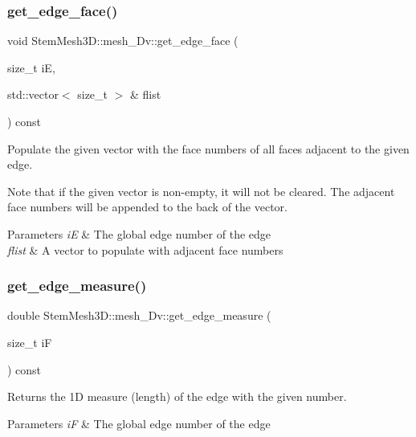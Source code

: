 \subsubsection{\texorpdfstring{get\+\_\+edge\+\_\+face()}{get\_edge\_face()}}
{\footnotesize\ttfamily void Stem\+Mesh3\+D\+::mesh\+\_\+Dv\+::get\+\_\+edge\+\_\+face (\begin{DoxyParamCaption}\item[{size\+\_\+t}]{iE,  }\item[{std\+::vector$<$ size\+\_\+t $>$ \&}]{flist }\end{DoxyParamCaption}) const}



Populate the given vector with the face numbers of all faces adjacent to the given edge. 

Note that if the given vector is non-\/empty, it will not be cleared. The adjacent face numbers will be appended to the back of the vector. 
\begin{DoxyParams}{Parameters}
{\em iE} & The global edge number of the edge \\
\hline
{\em flist} & A vector to populate with adjacent face numbers \\
\hline
\end{DoxyParams}
\mbox{\label{classStemMesh3D_1_1mesh__3Dv_a003b3bf1a525c821bfb5bb5cf666d3fe}} 
\subsubsection{\texorpdfstring{get\+\_\+edge\+\_\+measure()}{get\_edge\_measure()}}
{\footnotesize\ttfamily double Stem\+Mesh3\+D\+::mesh\+\_\+Dv\+::get\+\_\+edge\+\_\+measure (\begin{DoxyParamCaption}\item[{size\+\_\+t}]{iF }\end{DoxyParamCaption}) const}



Returns the 1D measure (length) of the edge with the given number. 


\begin{DoxyParams}{Parameters}
{\em iF} & The global edge number of the edge \\
\hline
\end{DoxyParams}
\mbox{\label{classStemMesh3D_1_1mesh__3Dv_ace07d45b45e79fd62e37530b6e5501c8}} 
